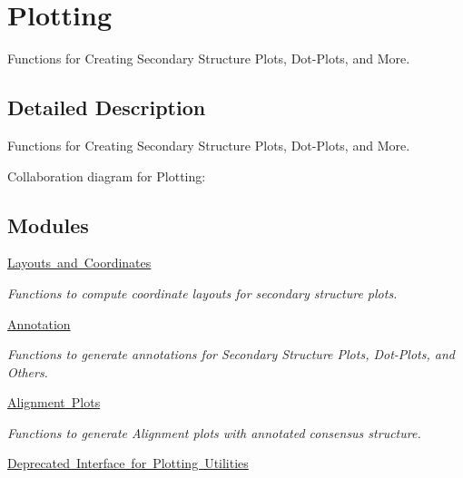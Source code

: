\hypertarget{group__plotting__utils}{}\section{Plotting}
\label{group__plotting__utils}


Functions for Creating Secondary Structure Plots, Dot-\/\+Plots, and More.  




\subsection{Detailed Description}
Functions for Creating Secondary Structure Plots, Dot-\/\+Plots, and More. 

Collaboration diagram for Plotting\+:
\subsection*{Modules}
\begin{DoxyCompactItemize}
\item 
\mbox{\hyperlink{group__plot__layout__utils}{Layouts and Coordinates}}
\begin{DoxyCompactList}\small\item\em Functions to compute coordinate layouts for secondary structure plots. \end{DoxyCompactList}\item 
\mbox{\hyperlink{group__annotation__utils}{Annotation}}
\begin{DoxyCompactList}\small\item\em Functions to generate annotations for Secondary Structure Plots, Dot-\/\+Plots, and Others. \end{DoxyCompactList}\item 
\mbox{\hyperlink{group__alignment__plots}{Alignment Plots}}
\begin{DoxyCompactList}\small\item\em Functions to generate Alignment plots with annotated consensus structure. \end{DoxyCompactList}\item 
\mbox{\hyperlink{group__plotting__utils__deprecated}{Deprecated Interface for Plotting Utilities}}
\end{DoxyCompactItemize}
